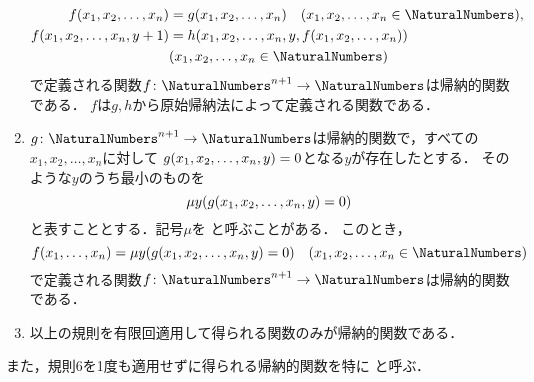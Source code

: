 \begin{Def}
\begin{enumerate}
		      \begin{align*}
			      \apply{f}{x_1, x_2, \dots, x_n}        & = \apply{g}{x_1, x_2, \dots, x_n} \quad \text{(\(x_1, x_2, \dots, x_n \in \NaturalNumbers\))}, \\
			      \apply{f}{x_1, x_2, \dots, x_n, y + 1} & = \apply{h}{x_1, x_2, \dots, x_n, y, \apply{f}{x_1, x_2, \dots, x_n}}                          \\
			                                             & \text{(\(x_1, x_2, \dots, x_n \in \NaturalNumbers\))}
		      \end{align*}
		      で定義される関数\(f \colon \NaturalNumbers^{n+1} \to \NaturalNumbers\)は帰納的関数である．
		      \(f\)は\(g, h\)から原始帰納法によって定義される関数である．
		\item \(g \colon \NaturalNumbers^{n + 1} \to \NaturalNumbers\)は帰納的関数で，すべての\(x_1, x_2, \dots, x_n\)に対して
		      \(\apply{g}{x_1, x_2, \dots, x_n, y} = 0\)となる\(y\)が存在したとする．
		      そのような\(y\)のうち最小のものを
		      \begin{equation}
			      \apply{\muoperator y}{\apply{g}{x_1, x_2, \dots, x_n, y} = 0}
			      \label{eq:muoperator}
		      \end{equation}
		      と表すこととする．記号\(\mu\)を
		      と呼ぶことがある．
		      このとき，
		      \[
			      \apply{f}{x_1, \dots, x_n} = \apply{\muoperator y}{\apply{g}{x_1, x_2, \dots, x_n, y} = 0}
			      \quad \text{(\(x_1, x_2, \dots, x_n \in \NaturalNumbers\))}
		      \]
		      で定義される関数\(f \colon \NaturalNumbers^{n+1} \to \NaturalNumbers\)は帰納的関数である．
		\item 以上の規則を有限回適用して得られる関数のみが帰納的関数である．
	\end{enumerate}

	また，規則6を1度も適用せずに得られる帰納的関数を特に
	と呼ぶ．
\end{Def}


